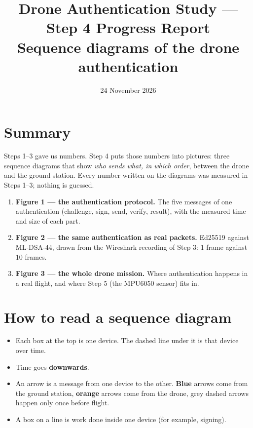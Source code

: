 \documentclass[10pt,a4paper]{article}
\title{Drone Authentication Study --- Step 4 Progress Report\\[3pt]
\large Sequence diagrams of the drone authentication}
\author{}
\date{24 November 2026}
\begin{document}
\maketitle

\section*{Summary}

Steps 1--3 gave us numbers. Step 4 puts those numbers into pictures: three sequence diagrams that
show \emph{who sends what, in which order}, between the drone and the ground station. Every number
written on the diagrams was measured in Steps 1--3; nothing is guessed.

\begin{enumerate}[nosep]
  \item \textbf{Figure 1 --- the authentication protocol.} The five messages of one authentication
        (challenge, sign, send, verify, result), with the measured time and size of each part.
  \item \textbf{Figure 2 --- the same authentication as real packets.} Ed25519 against ML-DSA-44,
        drawn from the Wireshark recording of Step 3: 1 frame against 10 frames.
  \item \textbf{Figure 3 --- the whole drone mission.} Where authentication happens in a real
        flight, and where Step 5 (the MPU6050 sensor) fits in.
\end{enumerate}

\section{How to read a sequence diagram}

\begin{itemize}[nosep]
  \item Each box at the top is one device. The dashed line under it is that device over time.
  \item Time goes \textbf{downwards}.
  \item An arrow is a message from one device to the other. \textcolor[HTML]{2a78d6}{\textbf{Blue}}
        arrows come from the ground station, \textcolor[HTML]{eb6834}{\textbf{orange}} arrows come
        from the drone, grey dashed arrows happen only once before flight.
  \item A box on a line is work done inside one device (for example, signing).
\end{itemize}
\end{document}
